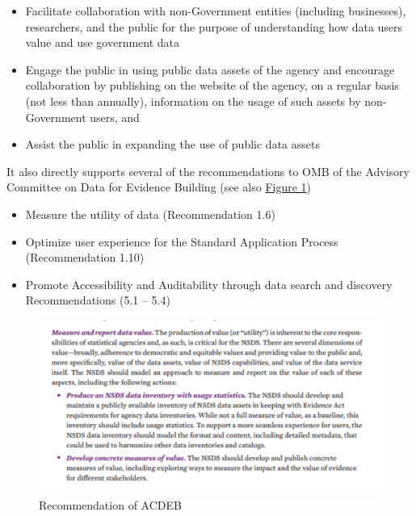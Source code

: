 \documentclass[titlepage, 11pt]{article}
\begin{document}
{\begin{itemize}
    \item Facilitate collaboration with non-Government entities (including businesses), researchers, and the public for the purpose of understanding how data users value and use government data 
    
    \item Engage the public in using public data assets of the agency and encourage collaboration by publishing on the website of the agency, on a regular basis (not less than annually), information on the usage of such assets by non-Government users, and 

    \item Assist the public in expanding the use of public data assets
\end{itemize}

It also directly supports several of the recommendations to OMB of the Advisory Committee on Data for Evidence Building (see also \hyperref[fig:advisory]{Figure 1})

\begin{itemize}
    \item Measure the utility of data (Recommendation 1.6)
    
    \item Optimize user experience for the Standard Application Process (Recommendation 1.10)

    \item Promote Accessibility and Auditability through data search and discovery Recommendations (5.1 – 5.4)
\end{itemize}


\begin{figure}
\centering
  \includegraphics[scale=0.50]{Advisory.png}
  \caption{Recommendation of ACDEB}
  \label{fig:advisory}
\end{figure}

}
\end{document}

